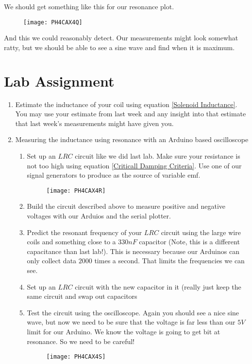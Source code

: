 We should get something like this for our resonance plot.

\begin{figure}[h!]
\texttt{[image: PH4CAX4Q]}
\end{figure}And this we could reasonably
detect. Our measurements might look somewhat ratty, but we should be able to
see a sine wave and find when it is maximum.

\section{Lab Assignment}

\begin{enumerate}
\item Estimate the inductance of your coil using equation \ref{Solenoid
Inductance}. You may use your estimate from last week and any insight into
that estimate that last week's measurements might have given you.

\item Measuring the inductance using resonance with an Arduino based
oscilloscope

\begin{enumerate}
\item Set up an $LRC$ circuit like we did last lab. Make sure your
resistance is not too high using equation \ref{Criticall Damping Criteria}.
Use one of our signal generators to produce as the source of variable emf. 
\begin{figure}[h!]
\texttt{[image: PH4CAX4R]}
\end{figure}

\item Build the circuit described above to measure positive and negative
voltages with our Arduios and the serial plotter.

\item Predict the resonant frequency of your $LRC$ circuit using the large
wire coils and something close to a $330\unit{nF}$ capacitor (Note, this is
a different capacitance than last lab!). This is necessary because our
Arduinos can only collect data $2000$ times a second. That limits the
frequencies we can see.

\item Set up an $LRC$ circuit with the new capacitor in it (really just keep
the same circuit and swap out capacitors

\item Test the circuit using the oscilloscope. Again you should see a nice
sine wave, but now we need to be sure that the voltage is far less than our $%
5\unit{V}$ limit for our Arduino. We know the voltage is going to get bit at
resonance. So we need to be careful! \begin{figure}[h!]
\texttt{[image: PH4CAX4S]}
\end{figure}


\end{enumerate}
\end{enumerate}
